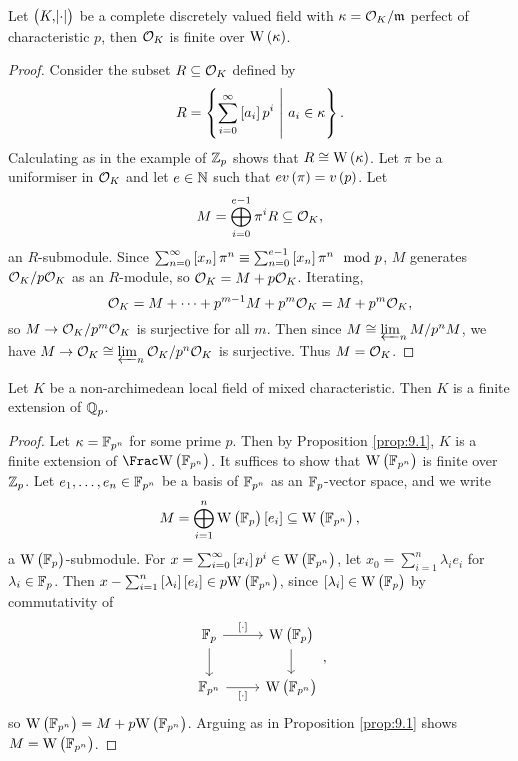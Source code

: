 \begin{proposition}
\label{prop:9.1}
Let $ \br{K, \abs{\cdot}} $ be a complete discretely valued field with $ \kappa = \mathcal{O}_K / \mathfrak{m} $ perfect of characteristic $ p $, then $ \mathcal{O}_K $ is finite over $ \W\br{\kappa} $.
\end{proposition}

\begin{proof}
Consider the subset $ R \subseteq \mathcal{O}_K $ defined by
$$ R = \cbr{\sum_{i = 0}^\infty \sbr{a_i}p^i \st a_i \in \kappa}. $$
Calculating as in the example of $ \mathbb{Z}_p $ shows that $ R \cong \W\br{\kappa} $. Let $ \pi $ be a uniformiser in $ \mathcal{O}_K $ and let $ e \in \mathbb{N} $ such that $ ev\br{\pi} = v\br{p} $. Let
$$ M = \bigoplus_{i = 0}^{e - 1} \pi^iR \subseteq \mathcal{O}_K, $$
an $ R $-submodule. Since $ \sum_{n = 0}^\infty \sbr{x_n}\pi^n \equiv \sum_{n = 0}^{e - 1} \sbr{x_n}\pi^n \mod p $, $ M $ generates $ \mathcal{O}_K / p\mathcal{O}_K $ as an $ R $-module, so $ \mathcal{O}_K = M + p\mathcal{O}_K $. Iterating,
$$ \mathcal{O}_K = M + \dots + p^{m - 1}M + p^m\mathcal{O}_K = M + p^m\mathcal{O}_K, $$
so $ M \to \mathcal{O}_K / p^m\mathcal{O}_K $ is surjective for all $ m $. Then since $ M \cong \varprojlim_n M / p^nM $, we have $ M \to \mathcal{O}_K \cong \varprojlim_n \mathcal{O}_K / p^n\mathcal{O}_K $ is surjective. Thus $ M = \mathcal{O}_K $.
\end{proof}

\pagebreak

\begin{theorem}
\label{thm:9.2}
Let $ K $ be a non-archimedean local field of mixed characteristic. Then $ K $ is a finite extension of $ \mathbb{Q}_p $.
\end{theorem}

\begin{proof}
Let $ \kappa = \mathbb{F}_{p^n} $ for some prime $ p $. Then by Proposition \ref{prop:9.1}, $ K $ is a finite extension of $ \Frac \W\br{\FF_{p^n}} $. It suffices to show that $ \W\br{\FF_{p^n}} $ is finite over $ \mathbb{Z}_p $. Let $ e_1, \dots, e_n \in \mathbb{F}_{p^n} $ be a basis of $ \mathbb{F}_{p^n} $ as an $ \mathbb{F}_p $-vector space, and we write
$$ M = \bigoplus_{i = 1}^n \W\br{\FF_p}\sbr{e_i} \subseteq \W\br{\FF_{p^n}}, $$
a $ \W\br{\FF_p} $-submodule. For $ x = \sum_{i = 0}^\infty \sbr{x_i}p^i \in \W\br{\FF_{p^n}} $, let $ x_0 = \sum_{i = 1}^n \lambda_ie_i $ for $ \lambda_i \in \mathbb{F}_p $. Then $ x - \sum_{i = 1}^n \sbr{\lambda_i}\sbr{e_i} \in p\W\br{\FF_{p^n}} $, since $ \sbr{\lambda_i} \in \W\br{\FF_p} $ by commutativity of
$$
\begin{tikzcd}
\FF_p \arrow{r}{\sbr{\cdot}} \arrow{d} & \W\br{\FF_p} \arrow{d} \\
\FF_{p^n} \arrow{r}[swap]{\sbr{\cdot}} & \W\br{\FF_{p^n}}
\end{tikzcd},
$$
so $ \W\br{\FF_{p^n}} = M + p\W\br{\FF_{p^n}} $. Arguing as in Proposition \ref{prop:9.1} shows $ M = \W\br{\FF_{p^n}} $.
\end{proof}

